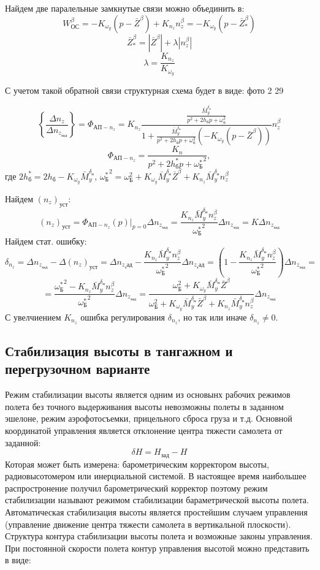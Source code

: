 \documentclass{article}
\begin{document}
Найдем две паралельные замкнутые связи можно объединить в: 
\[
W_{ОС}^\beta = - K_{\omega_y} (p - \bar{Z}^\beta) + K_{n_z} n_z^\beta = - K_{\omega_y}(p - \bar{Z}_*^\beta)
\]
\[
\bar{Z}_*^\beta = |\bar{Z}^\beta| + \lambda |n_z^\beta|
\]
\[
    \lambda = \frac{K_{n_z}}{K_{\omega_y}} 
\]

С учетом такой обратной связи структурная схема будет в виде:
фото 2 29

\[
\left\{\frac{\Delta n_z}{\Delta n_{z_{зад}}} \right\}  = \Phi_{АП-n_z} = K_{n_z}\frac{\frac{\bar{M}_y^{\delta_н}}{p^2 + 2 h_б p + \omega_б^2}}{1 +\frac{\bar{M}_y^{\delta_н}}{p^2 + 2 h_б p + \omega_б^2} (-K_{\omega_y}(p - \bar{Z}^\beta))}n_z^\beta  
\]
\[
\Phi_{АП-n_z} =\frac{K_n}{ p^2 + 2 h_б^*p + {\omega_Б^*}^2  }, 
\]
где $2h_б^* = 2h_б - K_{\omega_y}\bar{M}_y^{\delta_н}$, ${\omega_Б^*}^2 = \omega_Б^2 + K_{\omega_y}\bar{M}_y^{\delta_н} \bar{Z}^\beta + K_{n_z} \bar{M}_y^{\delta_н} n_z^\beta $

Найдем $(n_z)_{уст}$:
\[
(n_z)_{уст} = \Phi_{АП-n_z}(p) |_{p=0} \Delta n_{z_{зад}} =\frac{K_{n_z} \bar{M}_y^{\delta_н} n_z^\beta}{{\omega_Б^*}^2} \Delta n_{z_{зад}} = K \Delta n_{z_{зад}}
\]
Найдем стат. ошибку:
\[
    \delta_{n_z} = \Delta n_{z_{зад}} - \Delta (n_z)_{уст} = \Delta n_{z_зад} - \frac{K_{n_z} \bar{M}_y^{\delta_н}n_z^\beta}{{\omega_Б^*}^2} \Delta n_{z_зад} = \left( 1 - \frac{ K_{n_z} \bar{M}_y^{\delta_н} n_z^\beta}{{\omega_Б^*}^2} \right) \Delta n_{z_{зад}} = 
\]
\[
    = \frac{{\omega_Б^*}^2 - K_{n_z} \bar{M}_y^{\delta_н} n_z^\beta}{ {\omega_Б^*}^2} \Delta n_{z_{зад}} = \frac{\omega_Б^2 + K_{\omega_y} \bar{M}_y^{\delta_н} \bar{Z}^\beta}{\omega_Б^2 + K_{\omega_y} \bar{M}_y^{\delta_н} \bar{Z}^\beta + K_{n_z} \bar{M}_y^{\delta_н} n_z^\beta} \Delta n_{z_{зад}}
\]
С увелчиением $K_{n_z}$ ошибка регулирования $\delta_{n_z}$, но так или иначе $\delta_{n_z} \neq 0$.

\subsection{Стабилизация высоты в тангажном и перегрузочном варианте}
Режим стабилизации высоты является одним из основынх рабочих режимов полета без точного выдерживания высоты невозможны полеты в заданном эшелоне, режим аэрофотосъемки, прицельного сброса груза и т.д. Основной координатой управления является отклонение центра тяжести самолета от заданной:
\[
\delta H = H_{зад} - H
\]
Которая может быть измерена: барометрическим корректором высоты, радиовысотомером или инерциальной системой. В настоящее время наибольшее распростронение получил барометрический корректор поэтому режим стабилизации называют режимом стабилизации бараметрической высоты полета. Автоматическая стабилизация высоты является простейшим случаем управления (управление движение центра тяжести самолета в вертикальной плоскости). Структура контура стабилизации высоты полета и возможные законы управления. При постоянной скорости полета контур управления высотой можно представить в виде:
\end{document}
